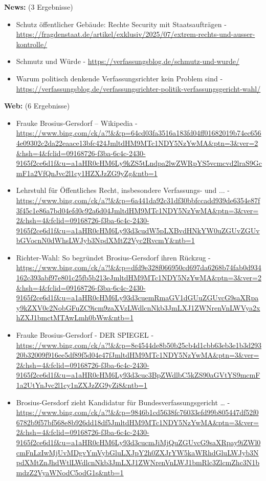 \documentclass[12pt,a4paper]{article}
\begin{document}
\textbf{News:} (3 Ergebnisse)
\begin{itemize}
\item Schutz öffentlicher Gebäude: Rechte Security mit Staatsaufträgen - \url{https://fragdenstaat.de/artikel/exklusiv/2025/07/extrem-rechts-und-ausser-kontrolle/}
\item Schmutz und Würde - \url{https://verfassungsblog.de/schmutz-und-wurde/}
\item Warum politisch denkende Verfassungsrichter kein Problem sind - \url{https://verfassungsblog.de/verfassungsrichter-politik-verfassungsgericht-wahl/}
\end{itemize}

\textbf{Web:} (6 Ergebnisse)
\begin{itemize}
\item Frauke Brosius-Gersdorf – Wikipedia - \url{https://www.bing.com/ck/a?!&&p=64cd03fa3516a183fd04ff01682019b74ec6564e09302c2da22eaace13bfc424JmltdHM9MTc1NDY5NzYwMA&ptn=3&ver=2&hsh=4&fclid=09168726-f3ba-6c4c-2430-9165f2ce6d1f&u=a1aHR0cHM6Ly9kZS5tLndpa2lwZWRpYS5vcmcvd2lraS9GcmF1a2VfQnJvc2l1cy1HZXJzZG9yZg&ntb=1}
\item Lehrstuhl für Öffentliches Recht, insbesondere Verfassungs- und ... - \url{https://www.bing.com/ck/a?!&&p=6a441da92c31df30bbfccadd939de6354e87f3f45c1e86a7bd04efd0c92a6d04JmltdHM9MTc1NDY5NzYwMA&ptn=3&ver=2&hsh=4&fclid=09168726-f3ba-6c4c-2430-9165f2ce6d1f&u=a1aHR0cHM6Ly93d3cudW5pLXBvdHNkYW0uZGUvZGUvbGVocnN0dWhsLWJyb3NpdXMtZ2Vyc2RvcmY&ntb=1}
\item Richter-Wahl: So begründet Brosius-Gersdorf ihren Rückzug - \url{https://www.bing.com/ck/a?!&&p=dfd9e328f066950cd697da6268b74fab0d934162c393abf97e801c25fb5b213eJmltdHM9MTc1NDY5NzYwMA&ptn=3&ver=2&hsh=4&fclid=09168726-f3ba-6c4c-2430-9165f2ce6d1f&u=a1aHR0cHM6Ly93d3cuemRmaGV1dGUuZGUvcG9saXRpay9kZXV0c2NobGFuZC9icm9zaXVzLWdlcnNkb3JmLXJ1ZWNrenVnLWVya2xhZXJ1bmctMTAwLmh0bWw&ntb=1}
\item Frauke Brosius-Gersdorf - DER SPIEGEL - \url{https://www.bing.com/ck/a?!&&p=8e4544de8b50b25cb4d1cbb63eb3e1b3d29320b32009f916ee5df89f5d04e47fJmltdHM9MTc1NDY5NzYwMA&ptn=3&ver=2&hsh=4&fclid=09168726-f3ba-6c4c-2430-9165f2ce6d1f&u=a1aHR0cHM6Ly93d3cuc3BpZWdlbC5kZS90aGVtYS9mcmF1a2UtYnJvc2l1cy1nZXJzZG9yZi8&ntb=1}
\item Brosius-Gersdorf zieht Kandidatur für Bundesverfassungsgericht … - \url{https://www.bing.com/ck/a?!&&p=9846b1cd5638fc76033efd99b805447df52f06782b9f57bf568e8b926dd18df5JmltdHM9MTc1NDY5NzYwMA&ptn=3&ver=2&hsh=4&fclid=09168726-f3ba-6c4c-2430-9165f2ce6d1f&u=a1aHR0cHM6Ly93d3cucmJiMjQuZGUvcG9saXRpay9iZWl0cmFnLzIwMjUvMDgvYmVybGluLXJpY2h0ZXJrYW5kaWRhdGluLWJyb3NpdXMtZnJhdWtlLWdlcnNkb3JmLXJ1ZWNrenVnLWJ1bmRlc3ZlcmZhc3N1bmdzZ2VyaWNodC5odG1s&ntb=1}
\end{itemize}
\end{document}

